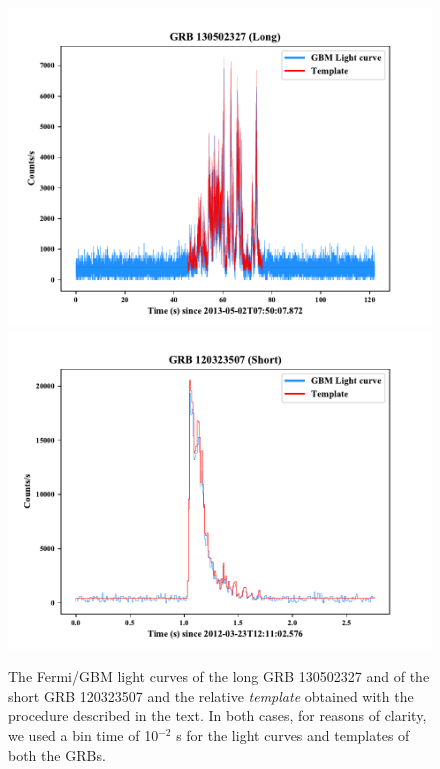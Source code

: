 \documentclass[]{spie}  %
\begin{document}
\begin{figure}[h!]
\centering
\includegraphics[scale=0.52,angle=0]{fig/Template_comparison_Long.pdf}
\includegraphics[scale=0.52,angle=0]{fig/Template_comparison_Short.pdf}

\caption{The Fermi/GBM light curves of the long GRB 130502327 and of the short GRB 120323507 and the relative \textit{template} obtained with the procedure described in the text. In both cases, for reasons of clarity, we used a bin time of 10$^{-2}$ s for the light curves and templates of both the GRBs.} 
\label{fig:template_short_long}
\end{figure}
\end{document}
